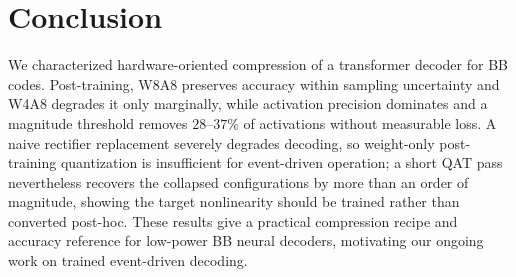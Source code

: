 ﻿\documentclass[conference]{IEEEtran}
\begin{document}
\section{Conclusion}
We characterized hardware-oriented compression of a transformer decoder
for BB codes. Post-training, W8A8 preserves accuracy within sampling
uncertainty and W4A8 degrades it only marginally, while activation
precision dominates and a magnitude threshold removes $28$--$37\%$ of
activations without measurable loss. A naive rectifier replacement
severely degrades decoding, so weight-only post-training quantization is
insufficient for event-driven operation; a short QAT pass nevertheless
recovers the collapsed configurations by more than an order of magnitude,
showing the target nonlinearity should be trained rather than converted
post-hoc. These results give a practical compression recipe and accuracy
reference for low-power BB neural decoders, motivating our ongoing work on
trained event-driven decoding.
\end{document}

